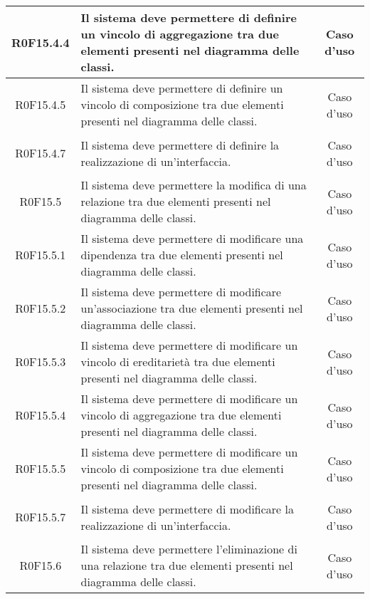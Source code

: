 \documentclass[../AnalisiDeiRequisiti.tex]{subfiles}
\begin{document}
\begin{longtable}{|c|>{\centering}p{7cm}|c|}
\hypertarget{R0F15.4.4}{R0F15.4.4} & Il sistema deve permettere di definire un vincolo di aggregazione tra due elementi presenti nel diagramma delle classi. & Caso d'uso \\ \hline
\hypertarget{R0F15.4.5}{R0F15.4.5} & Il sistema deve permettere di definire un vincolo di composizione tra due elementi presenti nel diagramma delle classi. & Caso d'uso \\ \hline
\hypertarget{R0F15.4.7}{R0F15.4.7} & Il sistema deve permettere di definire la realizzazione di un'interfaccia. & Caso d'uso \\ \hline
\hypertarget{R0F15.5}{R0F15.5} & Il sistema deve permettere la modifica di una relazione tra due elementi presenti nel diagramma delle classi. & Caso d'uso \\ \hline
\hypertarget{R0F15.5.1}{R0F15.5.1} & Il sistema deve permettere di modificare una dipendenza tra due elementi presenti nel diagramma delle classi. & Caso d'uso \\ \hline
\hypertarget{R0F15.5.2}{R0F15.5.2} & Il sistema deve permettere di modificare un'associazione tra due elementi presenti nel diagramma delle classi. & Caso d'uso \\ \hline
\hypertarget{R0F15.5.3}{R0F15.5.3} & Il sistema deve permettere di modificare un vincolo di ereditarietà tra due elementi presenti nel diagramma delle classi. & Caso d'uso \\ \hline
\hypertarget{R0F15.5.4}{R0F15.5.4} & Il sistema deve permettere di modificare un vincolo di aggregazione tra due elementi presenti nel diagramma delle classi. & Caso d'uso \\ \hline
\hypertarget{R0F15.5.5}{R0F15.5.5} & Il sistema deve permettere di modificare un vincolo di composizione tra due elementi presenti nel diagramma delle classi. & Caso d'uso \\ \hline
\hypertarget{R0F15.5.7}{R0F15.5.7} & Il sistema deve permettere di modificare la realizzazione di un'interfaccia. & Caso d'uso \\ \hline
\hypertarget{R0F15.6}{R0F15.6} & Il sistema deve permettere l'eliminazione di una relazione tra due elementi presenti nel diagramma delle classi. & Caso d'uso \\ \hline

\end{longtable}
\end{document}
